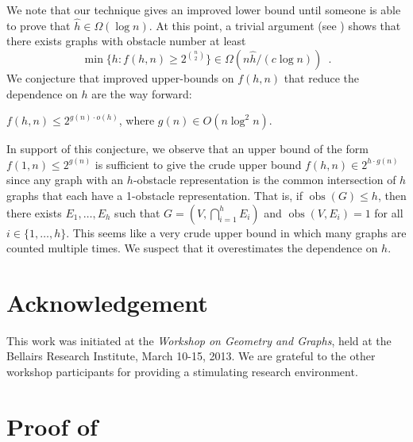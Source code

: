 \documentclass{patmorin}
\DeclareMathOperator{\obs}{obs}
\begin{document}
We note that our technique gives an improved lower bound until someone is
able to prove that $\hat h\in\Omega(\log n)$.  At this point, a trivial
argument (see \cite[Theorem~3]{mukkamala.pach.ea:graphs}) shows that
there exists graphs with obstacle number at least
\[
    \min\{h: f(h,n) \ge 2^{\binom{n}{2}}\} \in \Omega(n\hat h/(c\log n)) \enspace .
\]
We conjecture that improved upper-bounds on $f(h,n)$ that reduce the
dependence on $h$ are the way forward:
\begin{conj}
  $f(h,n) \le 2^{g(n)\cdot o(h)}$, where $g(n)\in O(n\log^2 n)$.
\end{conj}
In support of this conjecture, we observe that an upper bound of the
form $f(1,n)\le 2^{g(n)}$ is sufficient to give the crude upper bound
$f(h,n)\in 2^{h\cdot g(n)}$ since any graph with an $h$-obstacle
representation is the common intersection of $h$ graphs that each
have a 1-obstacle representation.  That is, if $\obs(G)\le h$, then
there exists $E_1,\ldots,E_h$ such that $G=(V,\bigcap_{i=1}^h E_i)$
and $\obs(V,E_i)=1$ for all $i\in \{1,\ldots,h\}$.  This seems like a
very crude upper bound in which many graphs are counted multiple times.
We suspect that it overestimates the dependence on $h$.


\section*{Acknowledgement}

This work was initiated at the \emph{Workshop on Geometry and Graphs},
held at the Bellairs Research Institute, March 10-15, 2013.  We are
grateful to the other workshop participants for providing a stimulating
research environment.





\appendix

\section{Proof of }
\end{document}
